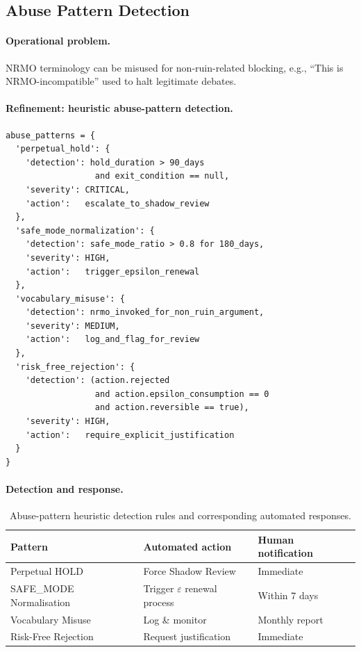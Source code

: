 \subsection{Abuse Pattern Detection}
\label{sec:abuse-detection}

\paragraph{Operational problem.}
NRMO terminology can be misused for non-ruin-related blocking,
e.g., ``This is NRMO-incompatible'' used to halt legitimate debates.

\paragraph{Refinement: heuristic abuse-pattern detection.}

\begin{lstlisting}[basicstyle=\ttfamily\scriptsize,frame=single]
abuse_patterns = {
  'perpetual_hold': {
    'detection': hold_duration > 90_days
                  and exit_condition == null,
    'severity': CRITICAL,
    'action':   escalate_to_shadow_review
  },
  'safe_mode_normalization': {
    'detection': safe_mode_ratio > 0.8 for 180_days,
    'severity': HIGH,
    'action':   trigger_epsilon_renewal
  },
  'vocabulary_misuse': {
    'detection': nrmo_invoked_for_non_ruin_argument,
    'severity': MEDIUM,
    'action':   log_and_flag_for_review
  },
  'risk_free_rejection': {
    'detection': (action.rejected
                  and action.epsilon_consumption == 0
                  and action.reversible == true),
    'severity': HIGH,
    'action':   require_explicit_justification
  }
}
\end{lstlisting}

\paragraph{Detection and response.}

\begin{table}[ht]
\centering
\small
\begin{tabularx}{\linewidth}{lXX}
\toprule
\textbf{Pattern} & \textbf{Automated action} & \textbf{Human notification} \\
\midrule
Perpetual HOLD
& Force Shadow Review
& Immediate \\
SAFE\_MODE Normalisation
& Trigger $\varepsilon$ renewal process
& Within 7 days \\
Vocabulary Misuse
& Log \& monitor
& Monthly report \\
Risk-Free Rejection
& Request justification
& Immediate \\
\bottomrule
\end{tabularx}
\caption[Abuse patterns detection and response]{Abuse-pattern
heuristic detection rules and corresponding automated responses.}
\label{tab:abuse-patterns}
\end{table}

